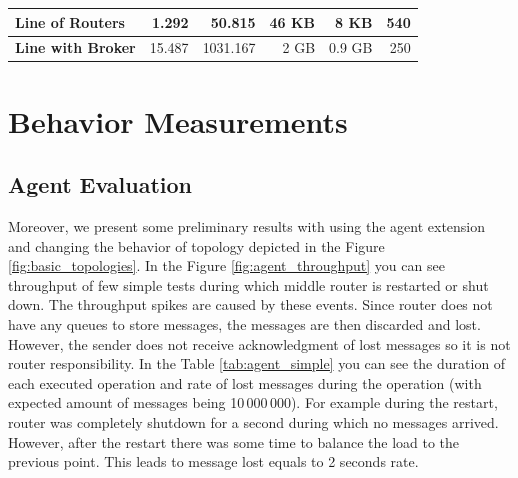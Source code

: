 \begin{table}[H]
\begin{tabular}{|l|r|r|r|r|r|}
	\textbf{Line of Routers}                                                           & \cellcolor[HTML]{9AFF99}1.292                               & 50.815                                                      & 46 KB                                                       & 8 KB                                                           & \cellcolor[HTML]{FFCCC9}540                                                                                                           \\ \hline
	\textbf{Line with Broker}                                                          & \cellcolor[HTML]{FFCCC9}15.487                              & 1031.167                                                    & 2 GB                                                        & 0.9 GB                                                         & \cellcolor[HTML]{9AFF99}250                                                                                                           \\ \hline
	\end{tabular}
	\end{table}
\endgroup

\newpage
\section{Behavior Measurements}
\label{Behavior Measurements}


\subsection{Agent Evaluation}
Moreover, we present some preliminary results with using the agent extension and changing the behavior of topology depicted in the Figure \ref{fig:basic_topologies}. In the Figure \ref{fig:agent_throughput} you can see throughput of few simple tests during which middle router is restarted or shut down. The throughput spikes are caused by these events. Since router does not have any queues to store messages, the messages are then discarded and lost. However, the sender does not receive acknowledgment of lost messages so it is not router responsibility. In the Table \ref{tab:agent_simple} you can see the duration of each executed operation and rate of lost messages during the operation (with expected amount of messages being 10\,000\,000). For example during the restart, router was completely shutdown for a second during which no messages arrived. However, after the restart there was some time to balance the load to the previous point. This leads to message lost equals to 2 seconds rate.

